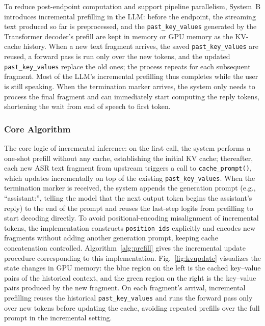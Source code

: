 \documentclass[conference]{IEEEtran}
\begin{document}
To reduce post-endpoint computation and support pipeline parallelism, System~B introduces incremental prefilling in the LLM: before the endpoint, the streaming text produced so far is preprocessed, and the \texttt{past\_key\_values} generated by the Transformer decoder's prefill are kept in memory or GPU memory as the KV-cache history. When a new text fragment arrives, the saved \texttt{past\_key\_values} are reused, a forward pass is run only over the new tokens, and the updated \texttt{past\_key\_values} replace the old ones; the process repeats for each subsequent fragment. Most of the LLM's incremental prefilling thus completes while the user is still speaking. When the termination marker arrives, the system only needs to process the final fragment and can immediately start computing the reply tokens, shortening the wait from end of speech to first token.

\subsubsection{Core Algorithm}

The core logic of incremental inference: on the first call, the system performs a one-shot prefill without any cache, establishing the initial KV cache; thereafter, each new ASR text fragment from upstream triggers a call to \texttt{cache\_prompt()}, which updates incrementally on top of the existing \texttt{past\_key\_values}. When the termination marker is received, the system appends the generation prompt (e.g., ``assistant:'', telling the model that the next output token begins the assistant's reply) to the end of the prompt and reuses the last-step logits from prefilling to start decoding directly. To avoid positional-encoding misalignment of incremental tokens, the implementation constructs \texttt{position\_ids} explicitly and encodes new fragments without adding another generation prompt, keeping cache concatenation controlled. Algorithm~\ref{alg:prefill} gives the incremental update procedure corresponding to this implementation. Fig.~\ref{fig:kvupdate} visualizes the state changes in GPU memory: the blue region on the left is the cached key--value pairs of the historical context, and the green region on the right is the key--value pairs produced by the new fragment. On each fragment's arrival, incremental prefilling reuses the historical \texttt{past\_key\_values} and runs the forward pass only over new tokens before updating the cache, avoiding repeated prefills over the full prompt in the incremental setting.
\end{document}
